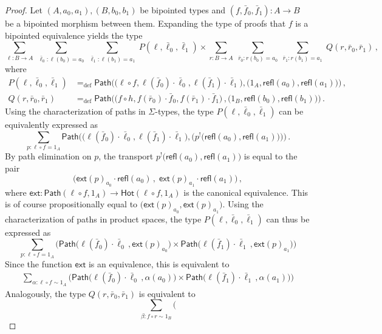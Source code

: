 \documentclass[10pt,a4paper,oneside,reqno]{amsart}
\numberwithin{equation}{section}
\theoremstyle{mythm}
\theoremstyle{mydef}
\theoremstyle{myrmk}
\newcommand{\defeq}{=_{\mathrm{def}}}
\newcommand{\co}{\colon}
\newcommand{\comp}{\circ}
\newcommand{\ext}{\mathsf{ext}}
\newcommand{\Hot}{\mathsf{Hot}}
\newcommand{\ct}{\cdot}
\newcommand{\Id}{\mathsf{Path}}
\newcommand{\refl}{\mathsf{refl}}
\begin{document}
\begin{proof}
Let $(A,a_0,a_1), (B,b_0,b_1)$ be bipointed types and $(f, \bar{f}_0, \bar{f}_1) \co A \to B$ be a bipointed morphism between them. Expanding the type of 
proofs that $f$ is a bipointed equivalence yields the type
\[
 \sum_{\ell \co B \to  A}  \; 
 \sum_{\bar{\ell}_0 : \ell(b_0)=a_0} \; 
 \sum_{\bar{\ell}_1 : \ell(b_1)=a_1} \; 
 P(\ell,\bar{\ell}_0,\bar{\ell}_1) \times
 \sum_{r \co B \to A} \; 
 \sum_{\bar{r}_0 : r(b_0)=a_0} \; 
 \sum_{\bar{r}_1 : r(b_1)=a_1} \; 
 Q(r,\bar{r}_0,\bar{r}_1)   \, ,
\]
where
\begin{align*}
P(\ell,\bar{\ell}_0,\bar{\ell}_1) & \defeq \Id \Big( \big( \ell \comp f, \ell(\bar{f}_0) \ct \bar{\ell}_0, \ell(\bar{f}_1) \ct \bar{\ell}_1\big), \big( 1_A, \refl(a_0), \refl(a_1) \big) \Big)  \, , \\
Q(r,\bar{r}_0,\bar{r}_1) & \defeq \Id \Big( \big( f \comp h,   f(\bar{r}_0) \ct \bar{f}_0, f(\bar{r}_1) \ct \bar{f}_1  \big) \, , \big( 1_B, \refl(b_0), \refl(b_1) \big) \Big) \, .
\end{align*}
Using the characterization of paths in $\Sigma$-types, the type $P(\ell,\bar{\ell}_0,\bar{\ell}_1)$ can be equivalently expressed as
\[
\sum_{p : \ell \comp f = 1_A}  
\Id \Big(  \big( \ell (\bar{f}_0) \ct \bar{\ell }_0, \ell (\bar{f}_1) \ct \bar{\ell }_1\big), \big( p^{!}\big(\refl(a_0), \refl(a_1) \big) \big) \Big) \, .
\]
By path elimination on $p$, the transport $p^{!}\big(\refl(a_0), \refl(a_1) \big)$ is equal to the pair 
\[
\big(  \ext(p)_{a_0} \ct \refl(a_0) \, , \;  \ext(p)_{a_1} \ct \refl(a_1) \big) \, ,
\]
where $\ext : \Id(\ell \comp f, 1_A) \to \Hot(\ell \comp f,  1_A)$ is the canonical equivalence. This is of course propositionally equal to $\big(\ext(p)_{a_0}, \ext(p)_{a_1} \big)$. Using the characterization of paths in product spaces, the type $P(\ell,\bar{\ell}_0,\bar{\ell}_1)$ can thus be expressed as
\[
\sum_{ p : \ell \comp f = 1_A} \Big(
\Id  \big( \ell (\bar{f}_0) \ct \bar{\ell}_0 \, ,  \ext(p)_{a_0} \big) 
\times 
\Id \big( \ell(\bar{f}_1) \ct \bar{\ell}_1 \, ,  \ext(p)_{a_1} \big)
\Big)
\]
Since the function $\ext$ is an equivalence, this is equivalent to
\begin{align*}
\sum_{\alpha : \ell \comp f \sim 1_A} 
\Big( \Id  \big( \ell (\bar{f}_0) \ct \bar{\ell}_0 \, ,  \alpha(a_0) \big) 
\times 
\Id \big( \ell(\bar{f}_1) \ct \bar{\ell}_1 \, ,  \alpha(a_1) \big)
\Big)
\end{align*}
Analogously, the type $Q(r,\bar{r}_0,\bar{r}_1)$ is equivalent to
\[
\sum_{\beta : f \comp r \sim 1_B}
\Big(
\]
\end{proof}
\end{document}
